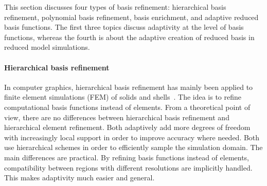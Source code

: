 This section discusses four types of basis refinement: hierarchical basis refinement, polynomial basis refinement, basis enrichment, and adaptive reduced basis functions.
The first three topics discuss adaptivity at the level of basis functions, whereas the fourth is about the adaptive creation of reduced basis in reduced model simulations.

\paragraph*{Hierarchical basis refinement}
In computer graphics, hierarchical basis refinement has mainly been applied to finite element simulations (FEM) of solids and shells~\cite{Capell2002,Grinspun2002}. The idea is to refine computational basis functions instead of elements. From a theoretical point of view, there are no differences between hierarchical basis refinement and hierarchical element refinement. Both adaptively add more degrees of freedom with increasingly local support in order to improve accuracy where needed. Both use hierarchical schemes in order to efficiently sample the simulation domain.
The main differences are practical. By refining basis functions instead of elements, compatibility between regions with different resolutions are implicitly handled.
This makes adaptivity much easier and general.

